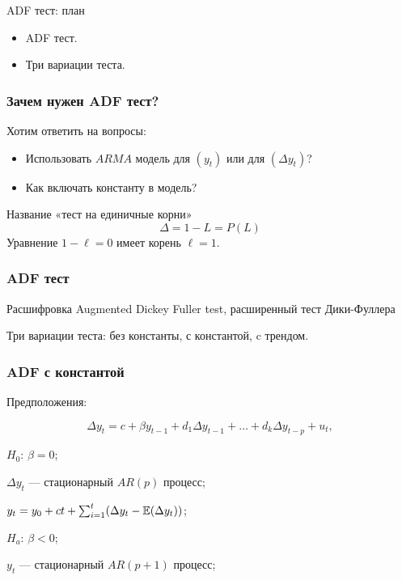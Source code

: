 
\begin{frame} %


\end{frame}



\begin{frame}{ADF тест: план}
  \begin{itemize}[<+->]
    \item ADF тест. 
    \item Три вариации теста.
  \end{itemize}

\end{frame}


\begin{frame}
  \frametitle{Зачем нужен ADF тест?}

  Хотим ответить на вопросы:
  \pause
  \begin{itemize}[<+->]
    \item Использовать $ARMA$ модель для $(y_t)$ или для $(\Delta y_t)$?
    \item Как включать константу в модель?
  \end{itemize}

  \pause
  Название «тест на единичные корни»
  \[
  \Delta = 1 - L = P(L) 
  \]
  Уравнение $1 - \ell = 0$ имеет корень $\ell =1$.

\end{frame}

\begin{frame}
  \frametitle{ADF тест}
  
  \begin{block}{Расшифровка}
    Augmented Dickey Fuller test, расширенный тест Дики-Фуллера  
  \end{block}

  \pause 
  Три вариации теста: без константы, с константой, c трендом.
  
\end{frame}


\begin{frame}
  \frametitle{ADF с константой}

  Предположения:

  \[
  \Delta y_t = c + \beta y_{t-1} + d_1 \Delta y_{t-1} + \ldots + d_k \Delta y_{t-p} + u_t,  
  \]

  \pause

  $H_0$: $\beta = 0$;
  
  $\Delta y_t$ — стационарный $AR(p)$ процесс;

  $y_t = y_0 + ct + \sum_{i=1}^t (\Delta y_t - \mathbb{E}(\Delta y_t))$;

  \pause

  $H_a$: $\beta < 0$;

  $y_t$ — стационарный $AR(p + 1)$ процесс;

\end{frame}


